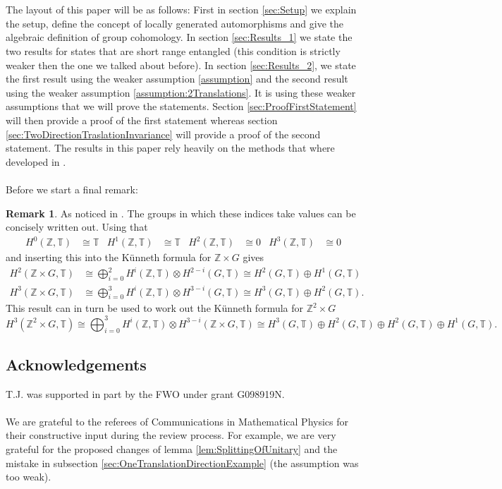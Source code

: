 \documentclass[12pt,a4paper,twoside]{article}
\newcommand{\ZZ}{\mathbb Z}
\newcommand{\TT}{\mathbb T}
\theoremstyle{definition}
\newtheorem{remark}[theorem]{Remark}
\numberwithin{equation}{section}
\begin{document}
\\\\
The layout of this paper will be as follows: First in section \ref{sec:Setup} we explain the setup, define the concept of locally generated automorphisms and give the algebraic definition of group cohomology. In section \ref{sec:Results_1} we state the two results for states that are short range entangled (this condition is strictly weaker then the one we talked about before). In section \ref{sec:Results_2}, we state the first result using the weaker assumption \ref{assumption} and the second result using the weaker assumption \ref{assumption:2Translations}. It is using these weaker assumptions that we will prove the statements. Section \ref{sec:ProofFirstStatement} will then provide a proof of the first statement whereas section \ref{sec:TwoDirectionTraslationInvariance} will provide a proof of the second statement. The results in this paper rely heavily on the methods that where developed in \cite{ogata2021h3gmathbb}.
\\\\
Before we start a final remark:
\begin{remark}
As noticed in \cite{Chen_2013}. The groups in which these indices take values can be concisely written out. Using that
	\begin{align}
		H^0(\ZZ,\TT)&\cong \TT& H^1(\ZZ,\TT)&\cong \TT& H^2(\ZZ,\TT)&\cong 0&H^3(\ZZ,\TT)&\cong 0
	\end{align}
	and inserting this into the K\"unneth formula for $\ZZ\times G$ gives
	\begin{align}
		H^2(\ZZ \times G,\TT)&\cong \bigoplus_{i=0}^2 H^i(\ZZ,\TT)\otimes H^{2-i}(G,\TT)\cong H^2(G,\TT)\oplus H^1(G,\TT)\\
		H^3(\ZZ \times G,\TT)&\cong \bigoplus_{i=0}^3 H^i(\ZZ,\TT)\otimes H^{3-i}(G,\TT)\cong H^3(G,\TT)\oplus H^2(G,\TT).
	\end{align}
	This result can in turn be used to work out the K\"unneth formula for $\ZZ^2\times G$
	\begin{equation}
		H^3(\ZZ^2\times G,\TT)\cong \bigoplus_{i=0}^3 H^i(\ZZ,\TT)\otimes H^{3-i}(\ZZ\times G,\TT)\cong H^3(G,\TT)\oplus H^2(G,\TT)\oplus H^2(G,\TT)\oplus H^1(G,\TT).
	\end{equation}
\end{remark}
\subsection*{Acknowledgements}
T.J. was supported in part by the FWO under grant G098919N.\\\\
We are grateful to the referees of Communications in Mathematical Physics for their constructive input during the review process. For example, we are very grateful for the proposed changes of lemma \ref{lem:SplittingOfUnitary} and the mistake in subsection \ref{sec:OneTranslationDirectionExample} (the assumption was too weak).
\clearpage
\end{document}
